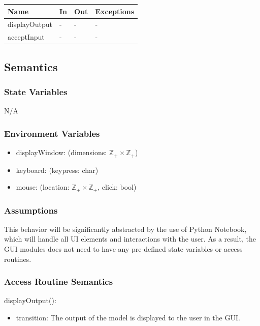 \documentclass[12pt, titlepage]{article}
\begin{document}
\begin{center}
\begin{tabular}{p{4cm} p{4cm} p{4cm} p{2cm}}
\hline
\textbf{Name} & \textbf{In} & \textbf{Out} & \textbf{Exceptions} \\
\hline
displayOutput & - & - & - \\
acceptInput & - & - & - \\
\hline
\end{tabular}
\end{center}

\subsection{Semantics}

\subsubsection{State Variables}

N/A

\subsubsection{Environment Variables}

\begin{itemize}
  \item displayWindow: (dimensions: $\mathbb{Z}_+ \times \mathbb{Z}_+$)
  \item keyboard: (keypress: char)
  \item mouse: (location: $\mathbb{Z}_+ \times \mathbb{Z}_+$, click: bool)
\end{itemize}

\subsubsection{Assumptions}

This behavior will be significantly abstracted by the use of Python Notebook,
which will handle all UI elements and interactions with the user. As a result,
the GUI modules does not need to have any pre-defined state variables or access
routines.

\subsubsection{Access Routine Semantics}

\noindent displayOutput():
\begin{itemize}
\item transition: The output of the model is displayed to the user in the GUI.
\end{itemize}
\end{document}
